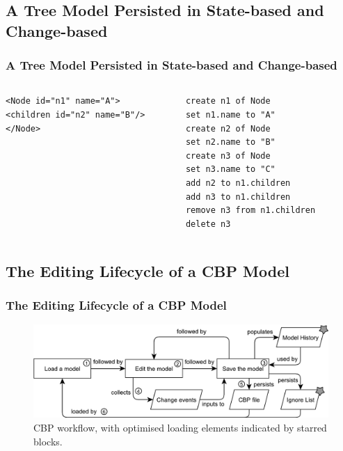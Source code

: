 \documentclass{beamer}
\begin{document}
\begin{frame}[fragile]
\section{A Tree Model Persisted in State-based and Change-based}
\frametitle{A Tree Model Persisted in State-based and Change-based}

\begin{columns}
\begin{column}[t]{0.5\linewidth}
\begin{lstlisting}[style=xmi,caption={The tree model persisted in state-based.},label=lst:xmimodel]
<Node id="n1" name="A">
<children id="n2" name="B"/>
</Node>
\end{lstlisting}
\end{column}
\begin{column}[t]{0.5\linewidth}
\begin{lstlisting}[style=eol,caption={The tree model persisted in change-based.},label=lst:cbpmodel]
create n1 of Node
set n1.name to "A"  
create n2 of Node
set n2.name to "B"  
create n3 of Node
set n3.name to "C"  
add n2 to n1.children   
add n3 to n1.children
remove n3 from n1.children   
delete n3
\end{lstlisting}
\end{column}
\end{columns}
\end{frame}

\begin{frame}
\section{The Editing Lifecycle of a CBP Model}
\frametitle{The Editing Lifecycle of a CBP Model}
\begin{figure}[ht]
    \centering
    \includegraphics[width=\linewidth]{flowchart}
    \caption{CBP workflow, with optimised loading elements indicated by starred blocks.}
    \label{fig:flowchart}
\end{figure}
\end{frame}
\end{document}
